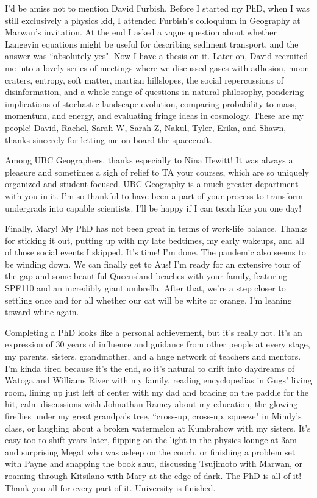 I'd be amiss not to mention David Furbish. Before I started my PhD, when I was still exclusively a physics kid, I attended Furbish's colloquium in Geography at Marwan's invitation. At the end I asked a vague question about whether Langevin equations might be useful for describing sediment transport, and the answer was ``absolutely yes". Now I have a thesis on it. Later on, David recruited me into a lovely series of meetings where we discussed gases with adhesion, moon craters, entropy, soft matter, martian hillslopes, the social repercussions of disinformation, and a whole range of questions in natural philosophy, pondering implications of stochastic landscape evolution, comparing probability to mass, momentum, and energy, and evaluating fringe ideas in cosmology. These are my people! David, Rachel, Sarah W, Sarah Z, Nakul, Tyler, Erika, and Shawn, thanks sincerely for letting me on board the spacecraft.

Among UBC Geographers, thanks especially to Nina Hewitt! It was always a pleasure and sometimes a sigh of relief to TA your courses, which are so uniquely organized and student-focused. UBC Geography is a much greater department with you in it. I'm so thankful to have been a part of your process to transform undergrads into capable scientists. I'll be happy if I can teach like you one day!

Finally, Mary! My PhD has not been great in terms of work-life balance. Thanks for sticking it out, putting up with my late bedtimes, my early wakeups, and all of those social events I skipped. It's time! I'm done. The pandemic also seems to be winding down. We can finally get to Aus! I'm ready for an extensive tour of the gap and some beautiful Queensland beaches with your family, featuring SPF110 and an incredibly giant umbrella. After that, we're a step closer to settling once and for all whether our cat will be white or orange. I'm leaning toward white again.

Completing a PhD looks like a personal achievement, but it's really not.
It's an expression of 30 years of influence and guidance from other people at every stage, my parents, sisters, grandmother, and a huge network of teachers and mentors.
I'm kinda tired because it's the end, so it's natural to drift into daydreams of Watoga and Williams River with my family, reading encyclopedias in Gugs' living room, lining up just left of center with my dad and bracing on the paddle for the hit, calm discussions with Johnathan Ramey about my education, the glowing fireflies under my great grandpa's tree, ``cross-up, cross-up, squeeze" in Mindy's class, or laughing about a broken watermelon at Kumbrabow with my sisters. It's easy too to shift years later, flipping on the light in the physics lounge at 3am and surprising Megat who was asleep on the couch, or finishing a problem set with Payne and snapping the book shut, discussing Tsujimoto with Marwan, or roaming through Kitsilano with Mary at the edge of dark. The PhD is all of it! Thank you all for every part of it. University is finished.




